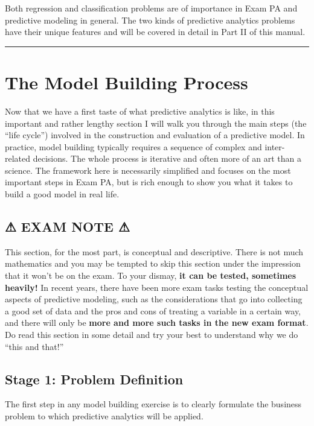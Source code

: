 \documentclass[
  12pt,
]{krantz}
\begin{document}
Both regression and classification problems are of importance in Exam PA and
predictive modeling in general. The two kinds of predictive analytics problems
have their unique features and will be covered in detail in Part II of this
manual.

\begin{center}\rule{0.5\linewidth}{0.5pt}\end{center}

\section{The Model Building Process}\label{the-model-building-process}

Now that we have a first taste of what predictive analytics is like, in this
important and rather lengthy section I will walk you through the main steps (the
``life cycle'') involved in the construction and evaluation of a predictive model.
In practice, model building typically requires a sequence of complex and
inter-related decisions. The whole process is iterative and often more of an art
than a science. The framework here is necessarily simplified and focuses on the
most important steps in Exam PA, but is rich enough to show you what it takes to
build a good model in real life.

\subsection*{⚠ EXAM NOTE ⚠}\label{exam-note}


This section, for the most part, is conceptual and descriptive. There is not
much mathematics and you may be tempted to skip this section under the
impression that it won't be on the exam. To your dismay, \textbf{it can be tested,
sometimes heavily!} In recent years, there have been more exam tasks testing
the conceptual aspects of predictive modeling, such as the considerations that
go into collecting a good set of data and the pros and cons of treating a
variable in a certain way, and there will only be \textbf{more and more such tasks in
the new exam format}. Do read this section in some detail and try your best to
understand why we do ``this and that!''

\subsection{Stage 1: Problem Definition}\label{stage-1-problem-definition}

The first step in any model building exercise is to clearly formulate the
business problem to which predictive analytics will be applied.
\end{document}
